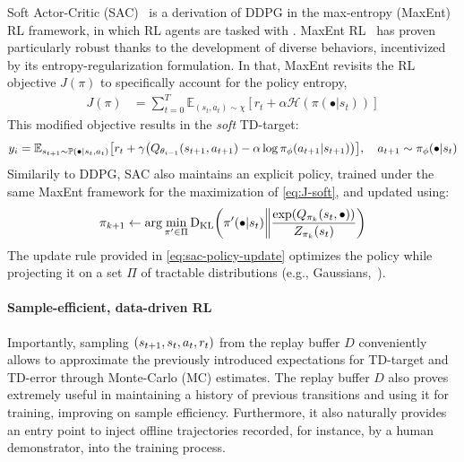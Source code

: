 Soft Actor-Critic (SAC)~\citep{haarnojaSoftActorCriticOffPolicy2018} is a derivation of DDPG in the max-entropy (MaxEnt) RL framework, in which RL agents are tasked with .
MaxEnt RL~\citep{haarnojaReinforcementLearningDeep2017} has proven particularly robust thanks to the development of diverse behaviors, incentivized by its entropy-regularization formulation.
In that, MaxEnt revisits the RL objective \( J (\pi) \) to specifically account for the policy entropy,
\begin{align}
    J(\pi) &= \sum_{t=0}^T \mathbb{E}_{(s_t, a_t) \sim \chi} \left[ r_t + \alpha \mathcal H(\pi (\bullet \vert s_t)) \right] \label{eq:J-soft}
\end{align}
This modified objective results in the \emph{soft} TD-target:
\begin{equation}\label{eq:soft-td-target}
    y_i = \mathbb E_{s_{t+1} \sim \mathbb P( \bullet \vert s_t, a_t)} \left[ r_t + \gamma \left( Q_{\theta_{i-1}} (\stateplusone, a_{t+1}) - \alpha \log \pi_\phi(a_{t+1} \vert \stateplusone) \right) \right], \quad a_{t+1} \sim \pi_\phi(\bullet \vert s_t)
\end{equation}
Similarily to DDPG, SAC also maintains an explicit policy, trained under the same MaxEnt framework for the maximization of \ref{eq:J-soft}, and updated using:
\begin{equation}\label{eq:sac-policy-update}
    \pi_{k+1} \leftarrow \arg\min_{\pi^\prime \in \Pi} \text{D}_{\text{KL}} \left(\pi^\prime (\bullet \vert \state) \bigg\Vert \frac{\exp(Q_{\pi_k}(s_t, \bullet))}{Z_{\pi_k}(s_t)} \right)
\end{equation}
The update rule provided in \ref{eq:sac-policy-update} optimizes the policy while projecting it on a set \( \Pi \) of tractable distributions (e.g., Gaussians,~\citet{haarnojaReinforcementLearningDeep2017}).

\paragraph{Sample-efficient, data-driven RL}
Importantly, sampling \( (s_{t+1}, s_t, a_t, r_t) \) from the replay buffer \( D \) conveniently allows to approximate the previously introduced expectations for TD-target and TD-error through Monte-Carlo (MC) estimates.
The replay buffer \( D \) also proves extremely useful in maintaining a history of previous transitions and using it for training, improving on sample efficiency.
Furthermore, it also naturally provides an entry point to inject offline trajectories recorded, for instance, by a human demonstrator, into the training process.


